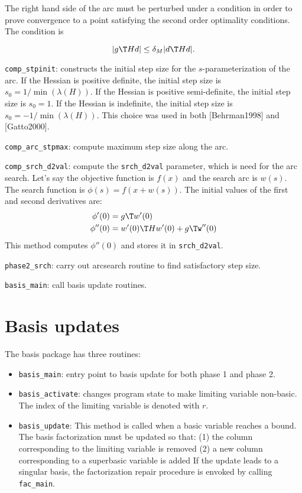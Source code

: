\documentclass[11pt]{article}
\newcommand{\code}[1]{\texttt{#1}}
\begin{document}
\begin{description}
  The right hand side of the arc must be perturbed under a condition in order
  to prove convergence to a point satisfying the second order optimality
  conditions.  The condition is

  \begin{equation*}
    |g\T H d| \le \delta_M|d\T H d|.
  \end{equation*}

\item \code{comp\_stpinit}: constructs the initial step size for the
  $s$-parameterization of the arc. If the Hessian is positive definite, the
  initial step size is $s_0 = 1/\min(\lambda(H))$.  If the Hessian is positive
  semi-definite, the initial step size is $s_0 = 1$.  If the Hessian is
  indefinite, the initial step size is $s_0 = -1/\min(\lambda(H))$.  This
  choice was used in both [Behrman1998] and [Gatto2000].

\item \code{comp\_arc\_stpmax}: compute maximum step size along the arc.
\item \code{comp\_srch\_d2val}: compute the \code{srch\_d2val} parameter, which
  is need for the arc search.  Let's say the objective function is $f(x)$ and
  the search arc is $w(s)$.  The search function is $\phi(s) = f(x +
  w(s))$. The initial values of the first and second derivatives are:
  \begin{align*}
    \phi'(0) &= g\T w'(0) \\
    \phi''(0) &= w'(0)\T H w'(0) + g\Tw''(0)
  \end{align*}
  This method computes $\phi''(0)$ and stores it in \code{srch\_d2val}.
\item \code{phase2\_srch}: carry out arcsearch routine to find satisfactory
  step size.
\item \code{basis\_main}: call basis update routines.
\end{description}

\section{Basis updates}

The basis package has three routines:
\begin{itemize}
\item \code{basis\_main}: entry point to basis update for both phase 1 and phase 2.
\item \code{basis\_activate}: changes program state to make limiting variable
  non-basic.  The index of the limiting variable is denoted with $r$.
\item \code{basis\_update}: This method is called when a basic variable reaches
  a bound.  The basis factorization must be updated so that: (1) the column
  corresponding to the limiting variable is removed (2) a new column
  corresponding to a superbasic variable is added If the update leads to a
  singular basis, the factorization repair procedure is envoked by calling
  \code{fac\_main}.

\end{itemize}
\end{document}
